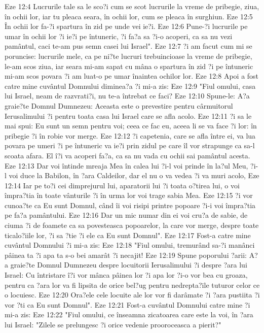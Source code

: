 Eze 12:4  Lucrurile tale sa le sco?i cum se scot lucrurile la vreme de pribegie, ziua, în ochii lor, iar tu pleaca seara, în ochii lor, cum se pleaca în surghiun.
Eze 12:5  În ochii lor fa-?i spartura în zid pe unde vei ie?i.
Eze 12:6  Pune-?i lucrurile pe umar în ochii lor ?i ie?i pe întuneric, ?i fa?a sa ?i-o acoperi, ca sa nu vezi pamântul, caci te-am pus semn casei lui Israel".
Eze 12:7  ?i am facut cum mi se poruncise: lucrurile mele, ca pe ni?te lucruri trebuincioase la vreme de pribegie, le-am scos ziua, iar seara mi-am sapat cu mâna o spartura în zid ?i pe întuneric mi-am scos povara ?i am luat-o pe umar înaintea ochilor lor.
Eze 12:8  Apoi a fost catre mine cuvântul Domnului diminea?a ?i mi-a zis:
Eze 12:9  "Fiul omului, casa lui Israel, neam de razvrati?i, nu te-a întrebat ce faci?
Eze 12:10  Spune-le: A?a graie?te Domnul Dumnezeu: Aceasta este o prevestire pentru cârmuitorul Ierusalimului ?i pentru toata casa lui Israel care se afla acolo.
Eze 12:11  ?i sa le mai spui: Eu sunt un semn pentru voi; ceea ce fac eu, aceea li se va face ?i lor: în pribegie ?i în robie vor merge.
Eze 12:12  ?i capetenia, care se afla între ei, va lua povara pe umeri ?i pe întuneric va ie?i prin zidul pe care îl vor strapunge ca sa-l scoata afara. El î?i va acoperi fa?a, ca sa nu vada cu ochii sai pamântul acesta.
Eze 12:13  Dar voi întinde mreaja Mea în calea lui ?i-l voi prinde în la?ul Meu, ?i-l voi duce la Babilon, în ?ara Caldeilor, dar el nu o va vedea ?i va muri acolo,
Eze 12:14  Iar pe to?i cei dimprejurul lui, aparatorii lui ?i toata o?tirea lui, o voi împra?tia în toate vânturile ?i în urma lor voi trage sabia Mea.
Eze 12:15  ?i vor cunoa?te ca Eu sunt Domnul, când îi voi risipi printre popoare ?i-i voi împra?tia pe fa?a pamântului.
Eze 12:16  Dar un mic numar din ei voi cru?a de sabie, de ciuma ?i de foamete ca sa povesteasca popoarelor, la care vor merge, despre toate ticalo?iile lor, ?i sa ?tie ?i ele ca Eu sunt Domnul".
Eze 12:17  Fost-a catre mine cuvântul Domnului ?i mi-a zis:
Eze 12:18  "Fiul omului, tremurând sa-?i manânci pâinea ta ?i apa ta s-o bei amarât ?i necajit!
Eze 12:19  Spune poporului ?arii: A?a graie?te Domnul Dumnezeu despre locuitorii Ierusalimului ?i despre ?ara lui Israel: Cu întristare î?i vor mânca pâinea lor ?i apa lor ?i-o vor bea cu groaza, pentru ca ?ara lor va fi lipsita de orice bel?ug pentru nedrepta?ile tuturor celor ce o locuiesc.
Eze 12:20  Ora?ele cele locuite ale lor vor fi darâmate ?i ?ara pustiita ?i vor ?ti ca Eu sunt Domnul".
Eze 12:21  Fost-a cuvântul Domnului catre mine ?i mi-a zis:
Eze 12:22  "Fiul omului, ce înseamna zicatoarea care este la voi, în ?ara lui Israel: "Zilele se prelungesc ?i orice vedenie prooroceasca a pierit?"

